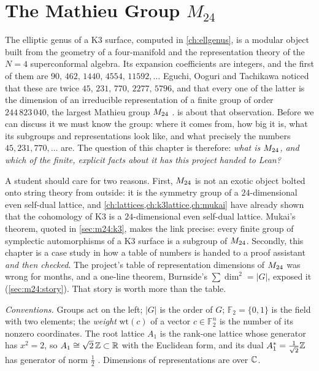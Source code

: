 \chapter{The Mathieu Group \texorpdfstring{$M_{24}$}{M24}}
\label{ch:m24}

The elliptic genus of a K3 surface, computed in \cref{ch:ellgenus}, is a modular object built
from the geometry of a four-manifold and the representation theory of the $N=4$
superconformal algebra. Its expansion coefficients are integers, and the first of them are
$90,\,462,\,1440,\,4554,\,11592,\dots$ Eguchi, Ooguri and Tachikawa noticed that these are twice
$45,\,231,\,770,\,2277,\,5796$, and that every one of the latter is the dimension of an
irreducible representation of a finite group of order $244\,823\,040$, the largest Mathieu
group $M_{24}$ .  is about that
observation. Before we can discuss it we must know the group: where it comes from, how big it
is, what its subgroups and representations look like, and what precisely the numbers
$45, 231, 770, \dots$ are. The question of this chapter is therefore: \emph{what is $M_{24}$,
and which of the finite, explicit facts about it has this project handed to Lean?}

A student should care for two reasons. First, $M_{24}$ is not an exotic object bolted onto
string theory from outside: it is the symmetry group of a $24$-dimensional even self-dual
lattice, and \cref{ch:lattices,ch:k3lattice,ch:mukai} have already shown that the
cohomology of K3 is a $24$-dimensional even self-dual lattice. Mukai's theorem, quoted in
\cref{sec:m24:k3}, makes the link precise: every finite group of symplectic automorphisms of
a K3 surface is a subgroup of $M_{24}$. Secondly, this chapter is a case study in how a table
of numbers is handed to a proof assistant \emph{and then checked}. The project's table of
representation dimensions of $M_{24}$ was wrong for months, and a one-line theorem, Burnside's
$\sum\dim^2=|G|$, exposed it (\cref{sec:m24:story}). That story is worth more than the table.

\emph{Conventions.} Groups act on the left; $|G|$ is the order of $G$; $\mathbb F_2=\{0,1\}$
is the field with two elements; the \emph{weight} $\mathrm{wt}(c)$ of a vector
$c\in\mathbb F_2^n$ is the number of its nonzero coordinates. The root lattice $A_1$ is the
rank-one lattice whose generator has $x^2=2$, so $A_1\cong\sqrt2\,\mathbb{Z}\subset\mathbb{R}$ with the
Euclidean form, and its dual $A_1^*=\tfrac1{\sqrt2}\mathbb{Z}$ has generator of norm $\tfrac12$
. Dimensions of representations are over $\mathbb{C}$.

